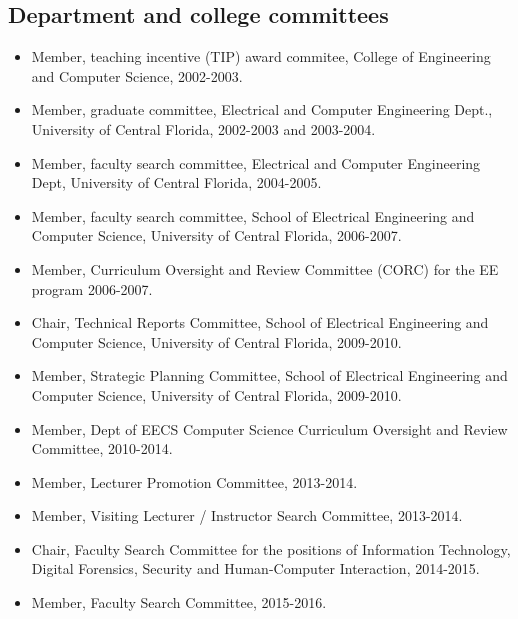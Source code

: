 \subsection*{Department and college committees}
    
\begin{itemize}

\item Member, teaching incentive (TIP) award commitee, College of Engineering and Computer Science, 2002-2003.

\item Member, graduate committee, Electrical and Computer Engineering Dept., University of Central Florida, 2002-2003 and 2003-2004.

\item Member, faculty search committee, Electrical and Computer Engineering Dept, University of Central Florida, 2004-2005.

\item Member, faculty search committee, School of Electrical Engineering and Computer Science, University of Central Florida, 2006-2007.

\item Member, Curriculum Oversight and Review Committee (CORC) for the EE
program 2006-2007.

\item Chair, Technical Reports Committee, School of Electrical Engineering and Computer Science, University of Central Florida, 2009-2010.

\item Member, Strategic Planning Committee, School of Electrical Engineering and Computer Science, University of Central Florida, 2009-2010.

\item Member, Dept of EECS Computer Science Curriculum Oversight and Review Committee, 2010-2014.

\item Member, Lecturer Promotion Committee, 2013-2014.

\item Member, Visiting Lecturer / Instructor Search Committee, 2013-2014.

\item Chair, Faculty Search Committee for the positions of Information Technology, Digital Forensics, Security and Human-Computer Interaction, 2014-2015.

\item Member, Faculty Search Committee, 2015-2016.


\end{itemize}

